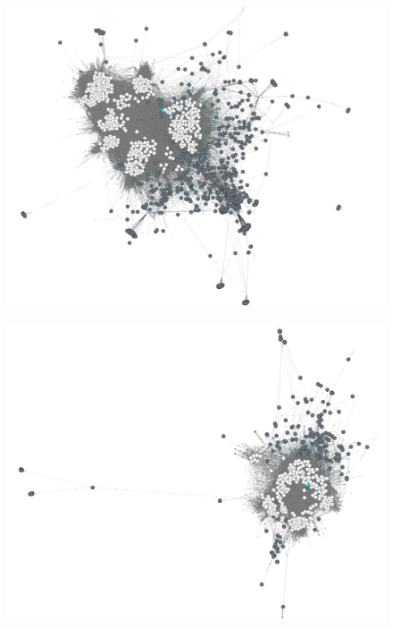 \begin{landscape}
\thispagestyle{empty}
\begin{figure}
\vspace{-3cm}
\begin{center}
\begin{minipage}[t]{0.40\textwidth}
\includegraphics[width=\textwidth]{./img/clostrid.png}
\label{figclost}
\end{minipage}
\begin{minipage}[t]{0.40\textwidth}
\includegraphics[width=\textwidth]{./img/actinobacter.png}
\label{figactino}

\end{minipage}
\end{center}
\end{figure}
\end{landscape}
